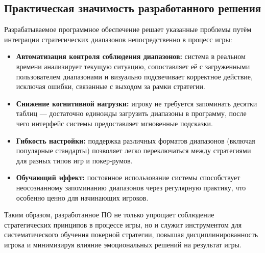 \subsection{Практическая значимость разработанного решения}
Разрабатываемое программное обеспечение решает указанные проблемы путём интеграции стратегических диапазонов непосредственно в процесс игры:

\begin{itemize}
    \item \textbf{Автоматизация контроля соблюдения диапазонов:} система в реальном времени анализирует текущую ситуацию, сопоставляет её с загруженными пользователем диапазонами и визуально подсвечивает корректное действие, исключая ошибки, связанные с выходом за рамки стратегии.
    
    \item \textbf{Снижение когнитивной нагрузки:} игроку не требуется запоминать десятки таблиц --- достаточно единожды загрузить диапазоны в программу, после чего интерфейс системы предоставляет мгновенные подсказки.
    
    \item \textbf{Гибкость настройки:} поддержка различных форматов диапазонов (включая популярные стандарты) позволяет легко переключаться между стратегиями для разных типов игр и покер-румов.
    
    \item \textbf{Обучающий эффект:} постоянное использование системы способствует неосознанному запоминанию диапазонов через регулярную практику, что особенно ценно для начинающих игроков.
\end{itemize}

Таким образом, разработанное ПО не только упрощает соблюдение стратегических принципов в процессе игры, но и служит инструментом для систематического обучения покерной стратегии, повышая дисциплинированность игрока и минимизируя влияние эмоциональных решений на результат игры.
